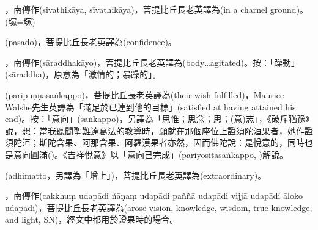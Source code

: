 \startitemgroup[noteitems]
\item{}，南傳作(sivathikāya, sīvathikāya)，菩提比丘長老英譯為(in a charnel ground)。(塜=塚)
\stopitemgroup

\startitemgroup[noteitems]
\item{}(pasādo)，菩提比丘長老英譯為(confidence)。
\stopitemgroup

\startitemgroup[noteitems]
\item{}，南傳作(sāraddhakāyo)，菩提比丘長老英譯為(body…agitated)。按：「躁動」(sāraddha)，原意為「激情的；暴躁的」。
\stopitemgroup

\startitemgroup[noteitems]
\item{}(paripuṇṇasaṅkappo)，菩提比丘長老英譯為(their wish fulfilled)，Maurice Walshe先生英譯為「滿足於已達到他的目標」(satisfied at having attained his end)。按：「意向」(saṅkappo)，另譯為「思惟；思念；思；(意)志」，《破斥猶豫》說，想：當我聽聞聖難達葛法的教導時，願就在那個座位上證須陀洹果者，她作證須陀洹；斯陀含果、阿那含果、阿羅漢果者亦然，因而佛陀說：是悅意的，同時也是意向圓滿()。《吉祥悅意》以「意向已完成」(pariyositasaṅkappo, )解說。
\stopitemgroup

\startitemgroup[noteitems]
\item{}(adhimatto，另譯為「增上」)，菩提比丘長老英譯為(extraordinary)。
\stopitemgroup

\startitemgroup[noteitems]
\item{}，南傳作(cakkhuṃ udapādi ñāṇaṃ udapādi paññā udapādi vijjā udapādi āloko udapādi)，菩提比丘長老英譯為(arose vision, knowledge, wisdom, true knowledge, and light, SN)，經文中都用於證果時的場合。
\stopitemgroup


